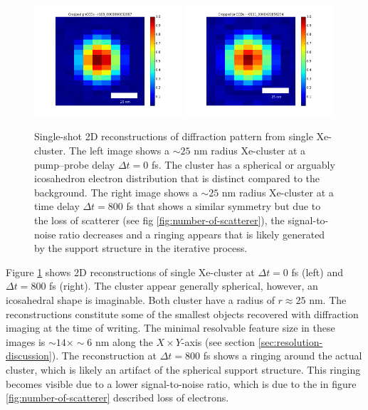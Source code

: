 \begin{figure}
	\centering
		\includegraphics[width=0.49\textwidth]{images/results/Xe_0_fs.png}
		\includegraphics[width=0.49\textwidth]{images/results/Xe_800_fs.png}
	\caption[Single-shot 2D reconstructions of $\sim 25$ nm radius Xe-clusters.]{Single-shot 2D reconstructions of diffraction pattern from single Xe-cluster. The left image shows a $\sim 25$ nm radius Xe-cluster at a pump--probe delay $\Delta t=0$ fs. The cluster has a spherical or arguably icosahedron electron distribution that is distinct compared to the background. The right image shows a $\sim 25$ nm radius Xe-cluster at a time delay $\Delta t=800$ fs that shows a similar symmetry but due to the loss of scatterer (see fig \ref{fig:number-of-scatterer}), the signal-to-noise ratio decreases and a ringing appears that is likely generated by the support structure in the iterative process.}
	\label{fig:Xe-2D-reconstructions}
\end{figure}
Figure \ref{fig:Xe-2D-reconstructions} shows 2D reconstructions of single Xe-cluster at $\Delta t = 0$ fs (left) and $\Delta t=800$ fs (right). The cluster appear generally spherical, however, an icosahedral shape is imaginable. Both cluster have a radius of $r\approx 25$ nm. The reconstructions constitute some of the smallest objects recovered with diffraction imaging at the time of writing. The minimal resolvable feature size in these images is $\sim 14\times \sim 6$ nm along the $X\times Y$-axis (see section \ref{sec:resolution-discussion}). The reconstruction at $\Delta t=800$ fs shows a ringing around the actual cluster, which is likely an artifact of the spherical support structure. This ringing becomes visible due to a lower signal-to-noise ratio, which is due to the in figure \ref{fig:number-of-scatterer} described loss of electrons.
%
%
%
